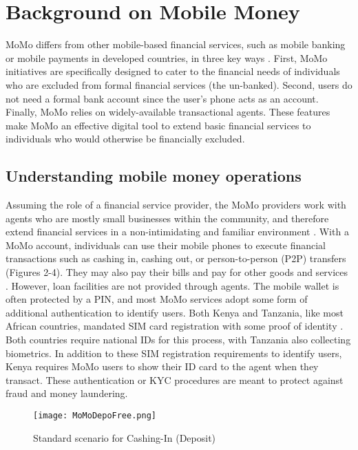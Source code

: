 \section{Background on Mobile Money}
\label {Sec:background}
MoMo differs from other mobile-based financial services, such as mobile banking or mobile payments in developed countries, in three key ways \cite{nan2019mobile}. First, MoMo initiatives are specifically designed to cater to the financial needs of individuals who are excluded from formal financial services (the un-banked). Second, users do not need a formal bank account since the user's phone acts as an account. Finally, MoMo relies on widely-available transactional agents. 
These features make MoMo an effective digital tool to extend basic financial services to individuals who would otherwise be financially excluded. 
 
\subsection{Understanding mobile money operations} 
Assuming the role of a financial service provider, the MoMo providers work with agents who are mostly small businesses within the community, and therefore extend financial services in a non-intimidating and familiar environment \cite{mckee2015doing}. With a MoMo account, individuals can use their mobile phones to execute financial transactions such as cashing in, cashing out, or person-to-person (P2P) transfers (Figures 2-4). They may also pay their bills and pay for other goods and services \cite{osakwe2022trust}. However, loan facilities are not provided through agents. The mobile wallet is often protected by a PIN, and most MoMo services adopt some form of additional authentication to identify users. Both Kenya and Tanzania, like most African countries, mandated SIM card registration with some proof of identity \cite{theodorou2021access}. Both countries require national IDs for this process, with Tanzania also collecting biometrics. In addition to these SIM registration requirements to identify users,  Kenya requires MoMo users to show their ID card to the agent when they transact. These authentication or KYC procedures are meant to protect against fraud and money laundering. 

\begin{figure}[t]
\texttt{[image: MoMoDepoFree.png]}
\caption{Standard scenario for Cashing-In (Deposit)}
\label{figDeposit}
\end{figure}


